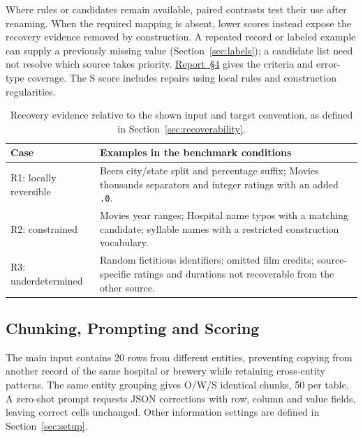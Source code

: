 \documentclass[sigconf, nonacm]{acmart}
\newcommand{\companionref}[1]{\href{https://github.com/hinsonver/CoRe-Benchmark/raw/refs/heads/main/paper/CoRe-Supplementary-Technical-Report.pdf\#nameddest=companion-#1}{Report~\S#1}}
\begin{document}
Where rules or candidates remain available, paired contrasts test their use after renaming.
When the required mapping is absent, lower scores instead expose the recovery evidence removed
by construction. A repeated record or labeled example can supply a previously missing value
(Section~\ref{sec:labels}); a candidate list need not resolve which source takes priority.
\companionref{4} gives the criteria and error-type coverage. The S score includes repairs
using local rules and construction regularities.

\begin{table}[t]
  \caption{Recovery evidence relative to the shown input and target convention, as defined in
  Section~\ref{sec:recoverability}.}
  \label{tab:recoverability}
  \small
  \begin{tabularx}{\columnwidth}{@{}>{\raggedright\arraybackslash}p{} >{\raggedright\arraybackslash}X@{}}
    \toprule
    Case & Examples in the benchmark conditions \\
    \midrule
    R1: locally reversible & Beers city/state split and percentage suffix; Movies thousands separators and integer ratings with an added \texttt{.0}. \\
    R2: constrained & Movies year ranges; Hospital name typos with a matching candidate; syllable names with a restricted construction vocabulary. \\
    R3: underdetermined & Random fictitious identifiers; omitted film credits; source-specific ratings and durations not recoverable from the other source. \\
    \bottomrule
  \end{tabularx}
\end{table}

\subsection{Chunking, Prompting and Scoring}\label{sec:scoring}

The main input contains 20 rows from different entities, preventing copying from another record
of the same hospital or brewery while retaining cross-entity patterns. The same entity grouping
gives O/W/S identical chunks, 50 per table. A zero-shot prompt requests JSON corrections with
row, column and value fields, leaving correct cells unchanged. Other information
settings are defined in Section~\ref{sec:setup}.
\end{document}
